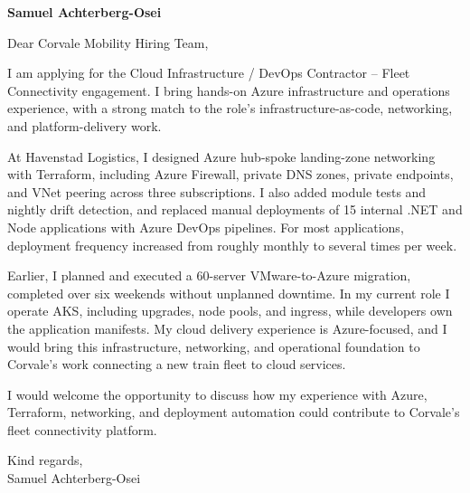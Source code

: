 \documentclass[11pt,a4paper]{article}
\begin{document}
\noindent\textbf{Samuel Achterberg-Osei}

\vspace{1.5em}
\noindent Dear Corvale Mobility Hiring Team,

\vspace{0.8em}
I am applying for the Cloud Infrastructure / DevOps Contractor – Fleet Connectivity engagement. I bring hands-on Azure infrastructure and operations experience, with a strong match to the role’s infrastructure-as-code, networking, and platform-delivery work.

\vspace{0.8em}
At Havenstad Logistics, I designed Azure hub-spoke landing-zone networking with Terraform, including Azure Firewall, private DNS zones, private endpoints, and VNet peering across three subscriptions. I also added module tests and nightly drift detection, and replaced manual deployments of 15 internal .NET and Node applications with Azure DevOps pipelines. For most applications, deployment frequency increased from roughly monthly to several times per week.

\vspace{0.8em}
Earlier, I planned and executed a 60-server VMware-to-Azure migration, completed over six weekends without unplanned downtime. In my current role I operate AKS, including upgrades, node pools, and ingress, while developers own the application manifests. My cloud delivery experience is Azure-focused, and I would bring this infrastructure, networking, and operational foundation to Corvale’s work connecting a new train fleet to cloud services.

\vspace{0.8em}
I would welcome the opportunity to discuss how my experience with Azure, Terraform, networking, and deployment automation could contribute to Corvale’s fleet connectivity platform.

\vspace{1.2em}
Kind regards,\\
Samuel Achterberg-Osei
\end{document}
